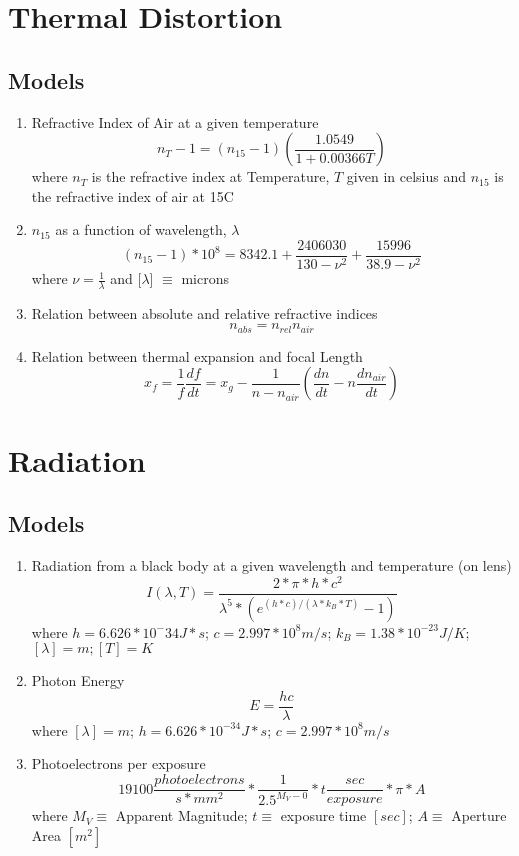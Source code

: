 \section{Thermal Distortion}
\subsection{Models}
\begin{enumerate}
    \item Refractive Index of Air at a given temperature \cite{thermal_effects_in_optical_systems}
    \[ n_{T} - 1 = (n_{15}-1)(\frac{1.0549}{1 + 0.00366T}) \]
    where $n_T$ is the refractive index at Temperature, $T$ given in celsius and $n_{15}$ is the refractive index of air at 15C

    \item $n_{15}$ as a function of wavelength, $\lambda$ \cite{thermal_effects_in_optical_systems}
    \[ (n_{15} - 1) * 10^8 = 8342.1 + \frac{2406030}{130-\nu^2} + \frac{15996}{38.9-\nu^2}\]
    where $\nu = \frac{1}{\lambda}$ and [$\lambda$] $\equiv$ microns

    \item Relation between absolute and relative refractive indices \cite{thermal_effects_in_optical_systems}
    \[ n_{abs} = n_{rel}n_{air} \]

    \item Relation between thermal expansion and focal Length \cite{thermal_effects_in_optical_systems}
    \[ x_f = \frac{1}{f}\frac{df}{dt} = x_g - \frac{1}{n - n_{air}} (\frac{dn}{dt}-n\frac{dn_{air}}{dt}) \]

\end{enumerate}

\section{Radiation}
\subsection{Models}
\begin{enumerate}
    \item Radiation from a black body at a given wavelength and temperature (on lens)\cite{accuracy_performance_of_star_trackers}
    \[ I(\lambda,T) = \frac{2*\pi*h*c^2}{\lambda^5*(e^{(h*c)/(\lambda*k_B*T)}-1)} \]
    where $h = 6.626*10^-34 J*s$; $c = 2.997*10^8 m/s$; $k_B = 1.38 * 10^{-23} J/K$; $[\lambda] = m; [T] = K$

    \item Photon Energy \cite{accuracy_performance_of_star_trackers}
    \[ E = \frac{hc}{\lambda} \]
    where $[\lambda] = m$; $h = 6.626*10^{-34} J*s$; $c = 2.997*10^8 m/s$

    \item Photoelectrons per exposure \cite{accuracy_performance_of_star_trackers}
    \[ 19100\frac{photoelectrons}{s*mm^2} * \frac{1}{2.5^{M_V-0}} * t\frac{sec}{exposure} * \pi * A \]
    where $M_V \equiv$ Apparent Magnitude; $t \equiv$ exposure time $[sec]$; $A \equiv$ Aperture Area $[m^{2}]$

\end{enumerate}


